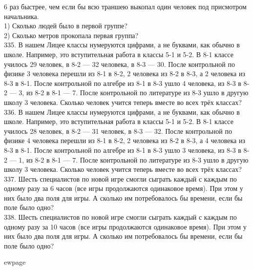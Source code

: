 6 раз быстрее, чем если бы всю траншею выкопал один человек под присмотром начальника.\\
1) Сколько людей было в первой группе?\\
2) Сколько метров прокопала первая группа?\\
335. В нашем Лицее классы нумеруются цифрами, а не буквами, как обычно в школе. Например, это вступительная работа в классы 5-1 и 5-2. В 8-1 классе училось 29 человек, в 8-2 --- 32 человека, в 8-3 --- 30. После контрольной по физике 3 человека перешли из 8-1 в 8-2, 2 человека из 8-2 в 8-3, а 2 человека из 8-3 в 8-1. После контрольной по алгебре из 8-1 в 8-3 ушло 4 человека, из 8-3 в 8-2 --- 3, из 8-2 в 8-1 --- 7. После контрольной по литературе из 8-3 ушло в другую школу 3 человека. Сколько человек учится теперь вместе во всех трёх классах?\\
336. В нашем Лицее классы нумеруются цифрами, а не буквами, как обычно в школе. Например, это вступительная работа в классы 5-1 и 5-2. В 8-1 классе училось 28 человек, в 8-2 --- 31 человек, в 8-3 --- 32. После контрольной по физике 4 человека перешли из 8-1 в 8-2, 2 человека из 8-2 в 8-3, а 4 человека из 8-3 в 8-1. После контрольной по алгебре из 8-1 в 8-3 ушло 3 человека, из 8-3 в 8-2 --- 1, из 8-2 в 8-1 --- 7. После контрольной по литературе из 8-3 ушло в другую школу 3 человека. Сколько человек учится теперь вместе во всех трёх классах?\\
337. Шесть специалистов по новой игре смогли сыграть каждый с каждым по одному разу за 6 часов (все игры продолжаются одинаковое время). При этом у них было два поля для игры. А сколько им потребовалось бы времени, если бы поле было одно?\\
338. Шесть специалистов по новой игре смогли сыграть каждый с каждым по одному разу за 10 часов (все игры продолжаются одинаковое время). При этом у них было два поля для игры. А сколько им потребовалось бы времени, если бы поле было одно?

ewpage
